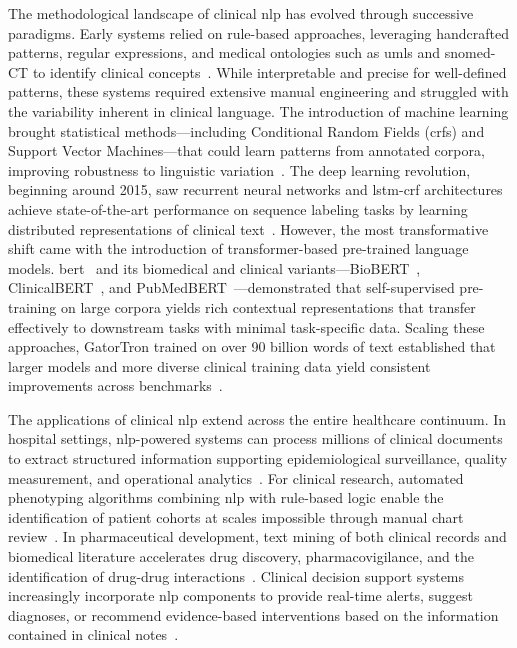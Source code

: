 The methodological landscape of clinical \gls{nlp} has evolved through successive paradigms. Early systems relied on rule-based approaches, leveraging handcrafted patterns, regular expressions, and medical ontologies such as \gls{umls} and \gls{snomed}-CT to identify clinical concepts~\citep{friedman2004natural}. While interpretable and precise for well-defined patterns, these systems required extensive manual engineering and struggled with the variability inherent in clinical language. The introduction of machine learning brought statistical methods---including Conditional Random Fields (\glspl{crf}) and Support Vector Machines---that could learn patterns from annotated corpora, improving robustness to linguistic variation~\citep{jiang2011systematic}. The deep learning revolution, beginning around 2015, saw recurrent neural networks and \gls{lstm}-\gls{crf} architectures achieve state-of-the-art performance on sequence labeling tasks by learning distributed representations of clinical text~\citep{wu2018deep, si2019enhancing}. However, the most transformative shift came with the introduction of transformer-based pre-trained language models. \gls{bert}~\citep{devlin2019bert} and its biomedical and clinical variants---BioBERT~\citep{lee2020biobert}, ClinicalBERT~\citep{huang2019clinicalbert}, and PubMedBERT~\citep{gu2021domain}---demonstrated that self-supervised pre-training on large corpora yields rich contextual representations that transfer effectively to downstream tasks with minimal task-specific data. Scaling these approaches, GatorTron trained on over 90 billion words of text established that larger models and more diverse clinical training data yield consistent improvements across benchmarks~\citep{yang2022large}.

The applications of clinical \gls{nlp} extend across the entire healthcare continuum. In hospital settings, \gls{nlp}-powered systems can process millions of clinical documents to extract structured information supporting epidemiological surveillance, quality measurement, and operational analytics~\citep{bean2023hospital}. For clinical research, automated phenotyping algorithms combining \gls{nlp} with rule-based logic enable the identification of patient cohorts at scales impossible through manual chart review~\citep{kirby2016phekb}. In pharmaceutical development, text mining of both clinical records and biomedical literature accelerates drug discovery, pharmacovigilance, and the identification of drug-drug interactions~\citep{harpaz2014text}. Clinical decision support systems increasingly incorporate \gls{nlp} components to provide real-time alerts, suggest diagnoses, or recommend evidence-based interventions based on the information contained in clinical notes~\citep{sutton2020overview}.

